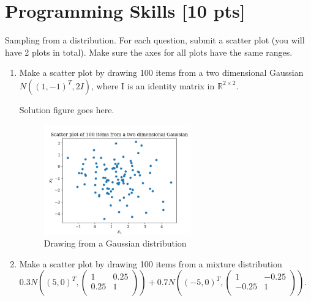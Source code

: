 \documentclass[a4paper]{article}
\theoremstyle{definition}
\newenvironment{soln}{
	\leavevmode\color{blue}\ignorespaces
}{}
\begin{document}
	
	
	\section{Programming Skills [10 pts]}
	Sampling from a distribution.  For each question, submit a scatter plot (you will have 2 plots in total).  Make sure the axes for all plots have the same ranges.
	\begin{enumerate}
		\item Make a scatter plot by drawing 100 items from a two dimensional Gaussian $N((1, -1)^{T}, 2I)$, where I is an identity matrix in $\mathbb{R}^{2 \times 2}$.
		
			\begin{soln}
			Solution figure goes here.\\
			\begin{figure}[h!]
			    \centering
			    \includegraphics[width=0.6\textwidth]{../images/7_a.png}  
			    \captionsetup{labelformat=empty}
			    \caption{Drawing from a Gaussian distribution}
			    \label{fig:guass}
			\end{figure}
		\end{soln}
	
		\item Make a scatter plot by drawing 100 items from a mixture distribution 
		$0.3 N\left((5, 0)^{T}, \begin{pmatrix} 1 & 0.25 \\ 0.25 & 1\\ \end{pmatrix}\right)
		+0.7 N\left((-5, 0)^{T}, \begin{pmatrix} 1 & -0.25 \\ -0.25 & 1\\ \end{pmatrix}\right)
		$.
		

\end{enumerate}
\end{document}
